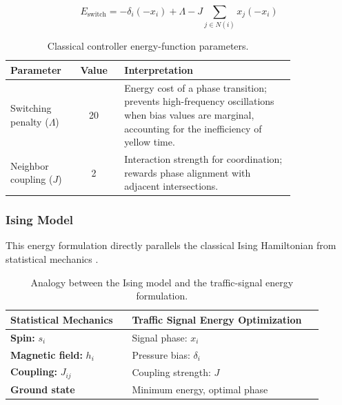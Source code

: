 \documentclass[12pt]{article}
\begin{document}
\begin{equation}
\label{eq:energy_switch}
    E_{\text{switch}} = -\delta_i(-x_i) + \Lambda - J \sum_{j\in N(i)} x_j(-x_i)
\end{equation}



\begin{table}[H]
\centering
\begin{tabular}{@{} p{0.22\linewidth} c p{0.60\linewidth} @{}}
\toprule
\textbf{Parameter} & \textbf{Value} & \textbf{Interpretation} \\
\midrule
Switching penalty ($\Lambda$) & 20 &
Energy cost of a phase transition; prevents high-frequency oscillations when bias values are marginal, accounting for the inefficiency of yellow time. \\
Neighbor coupling ($J$) & 2 &
Interaction strength for coordination; rewards phase alignment with adjacent intersections. \\
\bottomrule
\end{tabular}
\caption{Classical controller energy-function parameters.}
\label{tab:classical-params}
\end{table}

\subsubsection{Ising Model}

This energy formulation directly parallels the classical Ising Hamiltonian from statistical mechanics \cite{lucas2014}.

\begin{table}[H]
\centering
\begin{tabular}{@{} p{0.35\linewidth} p{0.55\linewidth} @{}}
\toprule
\textbf{Statistical Mechanics} & \textbf{Traffic Signal Energy Optimization} \\
\midrule
\textbf{Spin:} $s_i$ & Signal phase: $x_i$ \\

\textbf{Magnetic field:} $h_i$ & Pressure bias: $\delta_i$ \\

\textbf{Coupling:} $J_{ij}$ & Coupling strength: $J$ \\

\textbf{Ground state} & Minimum energy, optimal phase \\
\bottomrule
\end{tabular}
\caption{Analogy between the Ising model and the traffic-signal energy formulation.}
\label{tab:ising-analogy}
\end{table}
\end{document}
